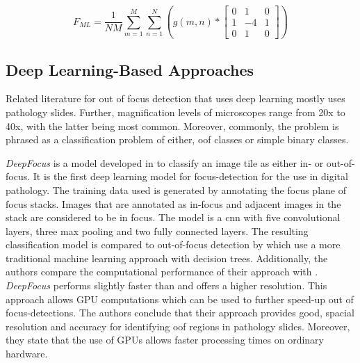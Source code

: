 \begin{equation}
    \label{eq:MeanLaplacian}
    F_{ML}= \frac{1}{NM} \sum_{m=1}^{M}\sum_{n=1}^{N} (g(m,n) *
    \begin{bmatrix}
        0 & 1 & 0 \\
        1 & -4 & 1 \\
        0 & 1 & 0 
    \end{bmatrix}
    )
\end{equation}

\subsection{Deep Learning-Based Approaches}
\label{sec:Foundations:RelatedWorks:DeepLearning}

Related literature for out of focus detection that uses deep learning mostly uses pathology slides. Further, magnification levels of microscopes range from 20x to 40x, with the latter being most common. Moreover, commonly, the problem is phrased as a classification problem of either, \ac{oof} classes or simple binary classes.

\emph{DeepFocus} is a model developed in \textcite{senaras2018deepfocus} to classify an image tile as either in- or out-of-focus. It is the first deep learning model for focus-detection for the use in digital pathology. The training data used is generated by annotating the focus plane of focus stacks. Images that are annotated as in-focus and adjacent images in the stack are considered to be in focus. The model is a \ac{cnn} with five convolutional layers, three max pooling and two fully connected layers. The resulting classification model is compared to out-of-focus detection by \textcite{moleslopez2013automated} which use a more traditional machine learning approach with decision trees.
Additionally, the authors compare the computational performance of their approach with \textcite{moleslopez2013automated}. \emph{DeepFocus} performs slightly faster than \textcite{moleslopez2013automated} and offers a higher resolution. This approach allows GPU computations which can be used to further speed-up out of focus-detections.
The authors conclude that their approach provides good, spacial resolution and accuracy for identifying \ac{oof} regions in pathology slides. Moreover, they state that the use of GPUs allows faster processing times on ordinary hardware.


